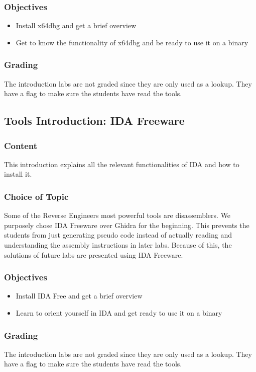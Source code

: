 \subsubsection*{Objectives}
\begin{itemize}
    \item Install x64dbg and get a brief overview
    \item Get to know the functionality of x64dbg and be ready to use it on a binary
\end{itemize}
\subsubsection*{Grading}
The introduction labs are not graded since they are only used as a lookup. They have a flag to make sure the students have read the tools.

\subsection{Tools Introduction: IDA Freeware}
\subsubsection*{Content}
This introduction explains all the relevant functionalities of IDA and how to install it.
\subsubsection*{Choice of Topic}
Some of the Reverse Engineers most powerful tools are disassemblers. We purposely chose IDA Freeware over Ghidra for the beginning. This prevents the students from just generating pseudo code instead of actually reading and understanding the assembly instructions in later labs. Because of this, the solutions of future labs are presented using IDA Freeware.
\subsubsection*{Objectives}
\begin{itemize}
    \item Install IDA Free and get a brief overview
    \item Learn to orient yourself in IDA and get ready to use it on a binary
\end{itemize}
\subsubsection*{Grading}
The introduction labs are not graded since they are only used as a lookup. They have a flag to make sure the students have read the tools.

